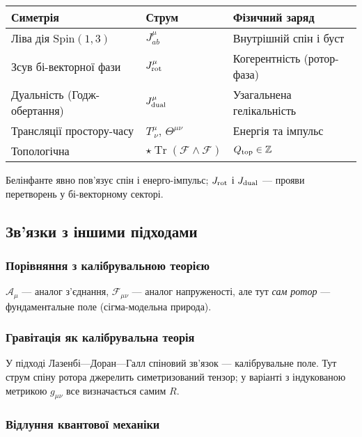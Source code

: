 \documentclass[11pt,a4paper]{article}
\numberwithin{equation}{section}
\theoremstyle{plain}
\theoremstyle{definition}
\theoremstyle{remark}
\DeclareMathOperator{\Tr}{Tr}
\begin{document}
\begin{center}
\renewcommand{\arraystretch}{1.3}
\begin{tabular}{@{}lll@{}}
\toprule
Симетрія & Струм & Фізичний заряд \\
\midrule
Ліва дія $\mathrm{Spin}(1,3)$ & $J^\mu_{ab}$ & Внутрішній спін і буст \\
Зсув бі-векторної фази & $J^\mu_{\rm rot}$ & Когерентність (ротор-фаза) \\
Дуальність (Годж-обертання) & $J^\mu_{\rm dual}$ & Узагальнена гелікальність \\
Трансляції простору-часу & $T^{\mu}_{\ \nu}$, $\Theta^{\mu\nu}$ & Енергія та імпульс \\
Топологічна & $\star\Tr(\mathcal{F}\wedge\mathcal{F})$ & $Q_{\rm top}\in\mathbb{Z}$ \\
\bottomrule
\end{tabular}
\end{center}

Белінфанте явно пов’язує спін і енерго-імпульс; $J_{\rm rot}$ і $J_{\rm dual}$ — прояви перетворень у бі-векторному секторі.

\subsection{Зв’язки з іншими підходами}

\subsubsection{Порівняння з калібрувальною теорією}

$\mathcal{A}_\mu$ — аналог з’єднання, $\mathcal{F}_{\mu\nu}$ — аналог напруженості, але тут \emph{сам ротор} — фундаментальне поле (сігма-модельна природа).

\subsubsection{Гравітація як калібрувальна теорія}

У підході Лазенбі—Доран—Галл спіновий зв’язок — калібрувальне поле. Тут струм спіну ротора джерелить симетризований тензор; у варіанті з індукованою метрикою $g_{\mu\nu}$ все визначається самим $R$.

\subsubsection{Відлуння квантової механіки}
\end{document}
